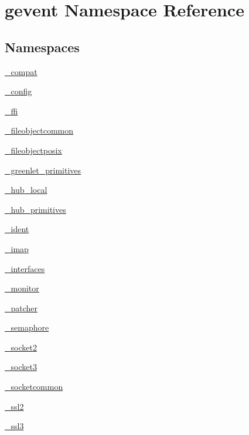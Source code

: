 \hypertarget{namespacegevent}{}\section{gevent Namespace Reference}
\label{namespacegevent}
\subsection*{Namespaces}
\begin{DoxyCompactItemize}
\item 
 \hyperlink{namespacegevent_1_1__compat}{\+\_\+compat}
\item 
 \hyperlink{namespacegevent_1_1__config}{\+\_\+config}
\item 
 \hyperlink{namespacegevent_1_1__ffi}{\+\_\+ffi}
\item 
 \hyperlink{namespacegevent_1_1__fileobjectcommon}{\+\_\+fileobjectcommon}
\item 
 \hyperlink{namespacegevent_1_1__fileobjectposix}{\+\_\+fileobjectposix}
\item 
 \hyperlink{namespacegevent_1_1__greenlet__primitives}{\+\_\+greenlet\+\_\+primitives}
\item 
 \hyperlink{namespacegevent_1_1__hub__local}{\+\_\+hub\+\_\+local}
\item 
 \hyperlink{namespacegevent_1_1__hub__primitives}{\+\_\+hub\+\_\+primitives}
\item 
 \hyperlink{namespacegevent_1_1__ident}{\+\_\+ident}
\item 
 \hyperlink{namespacegevent_1_1__imap}{\+\_\+imap}
\item 
 \hyperlink{namespacegevent_1_1__interfaces}{\+\_\+interfaces}
\item 
 \hyperlink{namespacegevent_1_1__monitor}{\+\_\+monitor}
\item 
 \hyperlink{namespacegevent_1_1__patcher}{\+\_\+patcher}
\item 
 \hyperlink{namespacegevent_1_1__semaphore}{\+\_\+semaphore}
\item 
 \hyperlink{namespacegevent_1_1__socket2}{\+\_\+socket2}
\item 
 \hyperlink{namespacegevent_1_1__socket3}{\+\_\+socket3}
\item 
 \hyperlink{namespacegevent_1_1__socketcommon}{\+\_\+socketcommon}
\item 
 \hyperlink{namespacegevent_1_1__ssl2}{\+\_\+ssl2}
\item 
 \hyperlink{namespacegevent_1_1__ssl3}{\+\_\+ssl3}
\item 

\end{DoxyCompactItemize}

